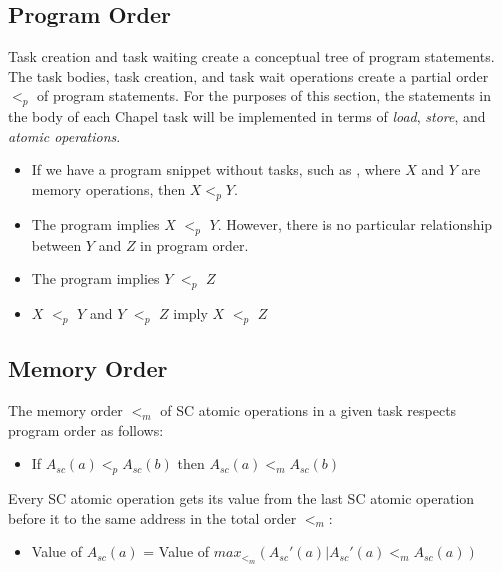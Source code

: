 \subsection{Program Order}
\label{program_order}

Task creation and task waiting create a conceptual tree of program
statements.  The task bodies, task creation, and task wait operations
create a partial order $<_p$ of program statements.  For the purposes
of this section, the statements in the body of each Chapel task will
be implemented in terms of \textit{load}, \textit{store}, and
\textit{atomic operations}.

\begin{itemize}
  \item If we have a program snippet without tasks, such as ,
  where $X$ and $Y$ are memory operations, then $X <_p Y$.

  \item The program  implies $X$ $<_p$ $Y$.
  However, there is no particular relationship between $Y$ and $Z$ in
  program order.

  \item The program  implies $Y$ $<_p$ $Z$

  \item $X$ $<_p$ $Y$ and $Y$ $<_p$ $Z$ imply $X$ $<_p$ $Z$

\end{itemize}


\subsection{Memory Order}
\label{memory_order}

The memory order $<_m$ of SC atomic operations in a given task
respects program order as follows:

\begin{itemize}
  \item If $A_{sc}(a)<_pA_{sc}(b)$ then $A_{sc}(a)<_mA_{sc}(b)$
\end{itemize}

Every SC atomic operation gets its value from the last SC atomic
operation before it to the same address in the total order $<_m$:
\begin{itemize}
  \item Value of $A_{sc}(a)$ = Value of $max_{<_m} (
  A_{sc}'(a)|A_{sc}'(a) <_m A_{sc}(a) ) $
\end{itemize}

